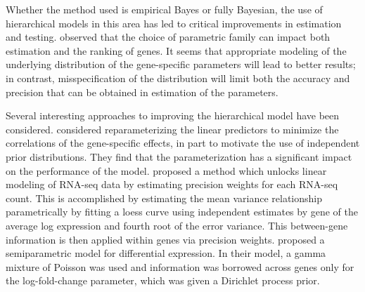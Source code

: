 Whether the method used is empirical Bayes or fully Bayesian, the use of hierarchical models in this area has led to critical improvements in estimation and testing. \citet{niemi} observed that the choice of parametric family can impact both estimation and the ranking of genes. It seems that appropriate modeling of the underlying distribution of the gene-specific parameters will lead to better results; in contrast, misspecification of the distribution will limit both the accuracy and precision that can be obtained in estimation of the parameters.


Several interesting approaches to improving the hierarchical model have been considered. \citet*{lithio} considered reparameterizing the linear predictors to minimize the correlations of the gene-specific effects, in part to motivate the use of independent prior distributions. They find that the parameterization has a significant impact on the performance of the model. 
\citet{voom} proposed a method which unlocks linear modeling of RNA-seq data by estimating precision weights for each RNA-seq count. This is accomplished by estimating the mean variance relationship parametrically by fitting a loess curve using independent estimates by gene of the average log expression and fourth root of the error variance. This between-gene information is then applied within genes via precision weights. \citet{liu} proposed a semiparametric model for differential expression. In their model, a gamma mixture of Poisson was used and information was borrowed across genes only for the log-fold-change parameter, which was given a Dirichlet process prior.

